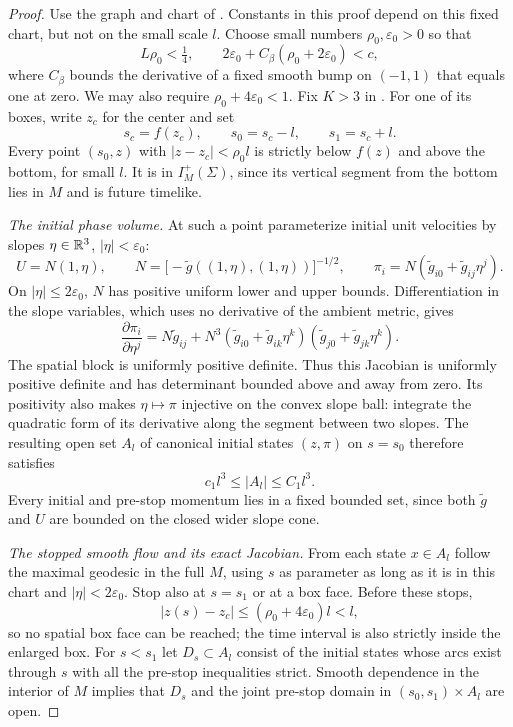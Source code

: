 \begin{proof}
Use the graph and chart of .  Constants in this
proof depend on this fixed chart, but not on the small scale
$l$.  Choose small numbers $\rho_0,\varepsilon_0>0$ so that
\begin{equation}\label{ex:cone-choice}
 L\rho_0<\tfrac14,
 \qquad 2\varepsilon_0+C_\beta(\rho_0+2\varepsilon_0)<c,
\end{equation}
where $C_\beta$ bounds the derivative of a fixed smooth bump
on $(-1,1)$ that equals one at zero.  We may also require
$\rho_0+4\varepsilon_0<1$.  Fix $K>3$ in .
For one of its boxes, write $z_c$ for the center and set
\[
 s_c=f(z_c),\qquad s_0=s_c-l,\qquad s_1=s_c+l.
\]
Every point $(s_0,z)$ with $|z-z_c|<\rho_0l$ is strictly
below $f(z)$ and above the bottom, for small $l$.  It is in
$I_M^+(\Sigma)$, since its vertical segment from the bottom
lies in $M$ and is future timelike.

\emph{The initial phase volume.}
At such a point parameterize initial unit velocities by
slopes $\eta\in\mathbb R^3$, $|\eta|<\varepsilon_0$:
\[
  U=N(1,\eta),\qquad
  N=\bigl[-\widetilde g((1,\eta),(1,\eta))\bigr]^{-1/2},
  \qquad
  \pi_i=N(\widetilde g_{i0}+\widetilde g_{ij}\eta^j).
\]
On $|\eta|\le2\varepsilon_0$, $N$ has positive uniform lower
and upper bounds.  Differentiation in the slope variables,
which uses no derivative of the ambient metric, gives
\begin{equation}\label{ex:momentum-jacobian}
 \frac{\partial\pi_i}{\partial\eta^j}
 =N\widetilde g_{ij}
  +N^3(\widetilde g_{i0}+\widetilde g_{ik}\eta^k)
       (\widetilde g_{j0}+\widetilde g_{jk}\eta^k).
\end{equation}
The spatial block is uniformly positive definite.  Thus this
Jacobian is uniformly positive definite and has determinant
bounded above and away from zero.  Its positivity also makes
$\eta\mapsto\pi$ injective on the convex slope ball: integrate
the quadratic form of its derivative along the segment between
two slopes.  The resulting open set $A_l$ of canonical initial
states $(z,\pi)$ on $s=s_0$ therefore satisfies
\begin{equation}\label{ex:initial-volume}
                c_1l^3\le |A_l|\le C_1l^3.
\end{equation}
Every initial and pre-stop momentum lies in a fixed bounded
set, since both $\widetilde g$ and $U$ are bounded on the
closed wider slope cone.

\emph{The stopped smooth flow and its exact Jacobian.}
From each state $x\in A_l$ follow the maximal geodesic in
the full $M$, using $s$ as parameter as long as it is in this
chart and $|\eta|<2\varepsilon_0$.  Stop also at $s=s_1$ or
at a box face.  Before these stops,
\[
            |z(s)-z_c|\le(\rho_0+4\varepsilon_0)l<l,
\]
so no spatial box face can be reached; the time interval is
also strictly inside the enlarged box.  For $s<s_1$ let
$D_s\subset A_l$ consist of the initial states whose arcs
exist through $s$ with all the pre-stop inequalities strict.
Smooth dependence in the interior of $M$ implies that $D_s$
and the joint pre-stop domain in $(s_0,s_1)\times A_l$ are open.


\end{proof}
